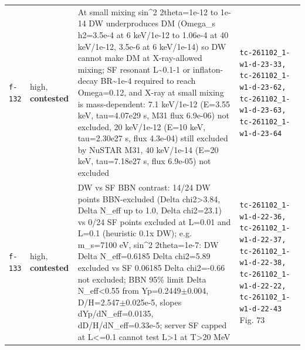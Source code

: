 \documentclass[11pt,a4paper]{article}
\begin{document}
\begin{longtable}{@{}p{}p{}p{}p{}@{}}
\texttt{f-132} & high, \textbf{contested} & At small mixing sin\textasciicircum{}2 2theta=1e-12 to 1e-14 DW underproduces DM (Omega\_s h2=3.5e-4 at 6 keV/1e-12 to 1.06e-4 at 40 keV/1e-12, 3.5e-6 at 6 keV/1e-14) so DW cannot make DM at X-ray-allowed mixing; SF resonant L\textasciitilde{}0.1-1 or inflaton-decay BR\textasciitilde{}1e-4 required to reach Omega=0.12, and X-ray at small mixing is mass-dependent: 7.1 keV/1e-12 (E=3.55 keV, tau=4.07e29 s, M31 flux 6.9e-06) not excluded, 20 keV/1e-12 (E=10 keV, tau=2.30e27 s, flux 4.3e-04) still excluded by NuSTAR M31, 40 keV/1e-14 (E=20 keV, tau=7.18e27 s, flux 6.9e-05) not excluded & \texttt{tc-261102\_\allowbreak{}1-w1-d-23-33,\allowbreak{} tc-261102\_\allowbreak{}1-w1-d-23-62,\allowbreak{} tc-261102\_\allowbreak{}1-w1-d-23-63,\allowbreak{} tc-261102\_\allowbreak{}1-w1-d-23-64} \\
\texttt{f-133} & high, \textbf{contested} & DW vs SF BBN contrast: 14/24 DW points BBN-excluded (Delta chi2\textgreater{}3.84, Delta N\_eff up to 1.0, Delta chi2=23.1) vs 0/24 SF points excluded at L=0.01 and L=0.1 (heuristic 0.1x DW); e.g. m\_s=7100 eV, sin\textasciicircum{}2 2theta=1e-7: DW Delta N\_eff=0.6185 Delta chi2=5.89 excluded vs SF 0.06185 Delta chi2=-0.66 not excluded; BBN 95\% limit Delta N\_eff\textless{}0.55 from Yp=0.2449$\pm$0.004, D/H=2.547$\pm$0.025e-5, slopes dYp/dN\_eff=0.0135, dD/H/dN\_eff=0.33e-5; server SF capped at L\textless{}=0.1 cannot test L\textgreater{}1 at T\textgreater{}20 MeV & \texttt{tc-261102\_\allowbreak{}1-w1-d-22-36,\allowbreak{} tc-261102\_\allowbreak{}1-w1-d-22-37,\allowbreak{} tc-261102\_\allowbreak{}1-w1-d-22-38,\allowbreak{} tc-261102\_\allowbreak{}1-w1-d-22-22,\allowbreak{} tc-261102\_\allowbreak{}1-w1-d-22-43} Fig. 73 \\
\bottomrule\end{longtable}
\end{document}
